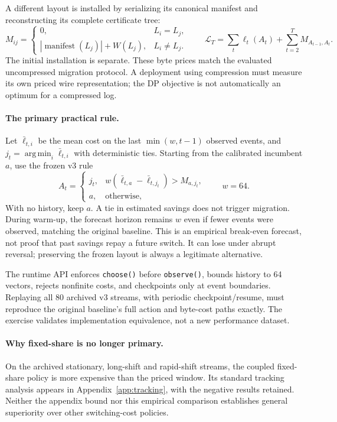 \documentclass[11pt]{article}
\theoremstyle{definition}\newtheorem{definition}[theorem]{Definition}
\DeclareMathOperator*{\argmin}{arg\,min}
\begin{document}
A different layout is installed by serializing its canonical manifest and reconstructing its complete certificate tree:
\begin{equation}\label{eq:migration}
 M_{ij}=\begin{cases}0,&L_i=L_j,\\
 |\operatorname{manifest}(L_j)|+W(L_j),&L_i\ne L_j.
 \end{cases}\qquad
 \mathcal L_T=\sum_t\ell_t(A_t)+\sum_{t=2}^T M_{A_{t-1},A_t}.
\end{equation}
The initial installation is separate. These byte prices match the evaluated uncompressed migration protocol. A deployment using compression must measure its own priced wire representation; the DP objective is not automatically an optimum for a compressed log.

\paragraph{The primary practical rule.}
Let $\bar\ell_{t,i}$ be the mean cost on the last $\min(w,t-1)$ observed events, and $j_t=\argmin_i\bar\ell_{t,i}$ with deterministic ties. Starting from the calibrated incumbent $a$, use the frozen v3 rule
\begin{equation}\label{eq:window}
 A_t=\begin{cases}j_t,&w(\bar\ell_{t,a}-\bar\ell_{t,j_t})>M_{a,j_t},\\a,&\text{otherwise},\end{cases}\qquad w=64.
\end{equation}
With no history, keep $a$. A tie in estimated savings does not trigger migration. During warm-up, the forecast horizon remains $w$ even if fewer events were observed, matching the original baseline. This is an empirical break-even forecast, not proof that past savings repay a future switch. It can lose under abrupt reversal; preserving the frozen layout is always a legitimate alternative.

The runtime API enforces \texttt{choose()} before \texttt{observe()}, bounds history to 64 vectors, rejects nonfinite costs, and checkpoints only at event boundaries. Replaying all 80 archived v3 streams, with periodic checkpoint/resume, must reproduce the original baseline's full action and byte-cost paths exactly. The exercise validates implementation equivalence, not a new performance dataset.

\paragraph{Why fixed-share is no longer primary.}
On the archived stationary, long-shift and rapid-shift streams, the coupled
fixed-share policy is more expensive than the priced window. Its standard
tracking analysis appears in Appendix~\ref{app:tracking}, with the negative
results retained. Neither the appendix bound nor this empirical comparison
establishes general superiority over other switching-cost policies.
\end{document}
